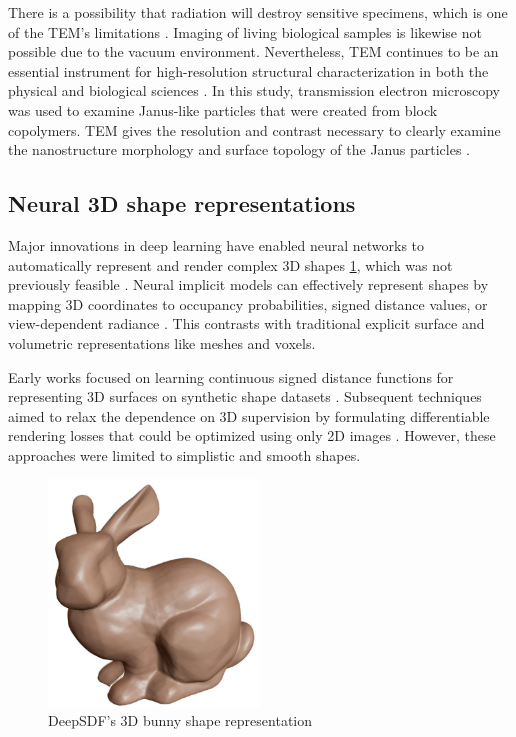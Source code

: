 There is a possibility that radiation will destroy sensitive specimens, which is one of the TEM's limitations \cite{Egerton2004}. Imaging of living biological samples is likewise not possible due to the vacuum environment. Nevertheless, TEM continues to be an essential instrument for high-resolution structural characterization in both the physical and biological sciences \cite{Egerton2004}. In this study, transmission electron microscopy was used to examine Janus-like particles that were created from block copolymers. TEM gives the resolution and contrast necessary to clearly examine the nanostructure morphology and surface topology of the Janus particles \cite{Tang2017}.


\subsection{Neural 3D shape representations}
Major innovations in deep learning have enabled neural networks to automatically represent and render complex 3D shapes \ref{fig:DeepSDF's 3D bunny shape representation}, which was not previously feasible \cite{Park2019}. Neural implicit models can effectively represent shapes by mapping 3D coordinates to occupancy probabilities, signed distance values, or view-dependent radiance \cite{Mescheder2018}. This contrasts with traditional explicit surface and volumetric representations like meshes and voxels.

\vspace{10pt}

Early works focused on learning continuous signed distance functions for representing 3D surfaces on synthetic shape datasets \cite{Sitzmann2020}. Subsequent techniques aimed to relax the dependence on 3D supervision by formulating differentiable rendering losses that could be optimized using only 2D images \cite{Wu2015}. However, these approaches were limited to simplistic and smooth shapes.
\vspace{10pt}

\begin{figure}[thbp]
    \centering
    \includegraphics[width=0.5\textwidth]{img/Neural 3D representation.png}
    \caption{DeepSDF's 3D bunny shape representation \cite{Park2019}}\label{fig:DeepSDF's 3D bunny shape representation}
\end{figure}


